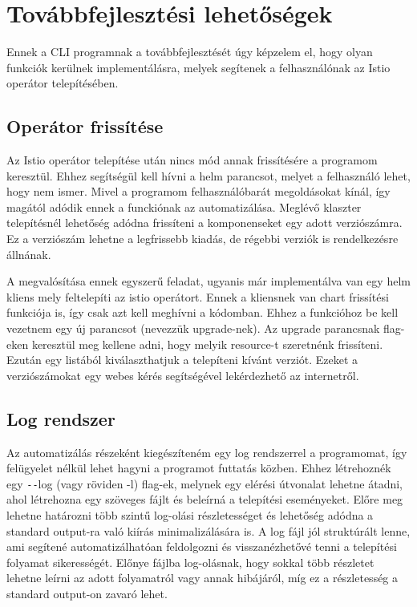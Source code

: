 \section{Továbbfejlesztési lehetőségek}
Ennek a CLI programnak a továbbfejlesztését úgy képzelem el, hogy olyan funkciók kerülnek implementálásra, melyek segítenek a felhasználónak az Istio operátor telepítésében.

\newpage

\subsection{Operátor frissítése}
Az Istio operátor telepítése után nincs mód annak frissítésére a programom keresztül.
Ehhez segítségül kell hívni a helm parancsot, melyet a felhasználó lehet, hogy nem ismer.
Mivel a programom felhasználóbarát megoldásokat kínál, így magától adódik ennek a funckiónak az automatizálása.
Meglévő klaszter telepítésnél lehetőség adódna frissíteni a komponenseket egy adott verziószámra.
Ez a verziószám lehetne a legfrissebb kiadás, de régebbi verziók is rendelkezésre állnának.

A megvalósítása ennek egyszerű feladat, ugyanis már implementálva van egy helm kliens mely feltelepíti az istio operátort.
Ennek a kliensnek van chart frissítési funkciója is, így csak azt kell meghívni a kódomban.
Ehhez a funkcióhoz be kell vezetnem egy új parancsot (nevezzük upgrade-nek).
Az upgrade parancsnak flag-eken keresztül meg kellene adni, hogy melyik resource-t szeretnénk frissíteni.
Ezután egy listából kiválaszthatjuk a telepíteni kívánt verziót. Ezeket a verziószámokat egy webes kérés segítségével lekérdezhető az internetről.

\subsection{Log rendszer}
Az automatizálás részeként kiegészíteném egy log rendszerrel a programomat, így felügyelet nélkül lehet hagyni a programot futtatás közben.
Ehhez létrehoznék egy \texttt{-{}-}log (vagy röviden -l) flag-ek, melynek egy elérési útvonalat lehetne átadni, ahol létrehozna egy szöveges fájlt és beleírná a telepítési eseményeket. Előre meg lehetne határozni több szintű log-olási részletességet és lehetőség adódna a standard output-ra való kiírás minimalizálására is.
A log fájl jól struktúrált lenne, ami segítené automatizálhatóan feldolgozni és visszanézhetővé tenni a telepítési folyamat sikerességét.
Előnye fájlba log-olásnak, hogy sokkal több részletet lehetne leírni az adott folyamatról vagy annak hibájáról, míg ez a részletesség a standard output-on zavaró lehet.

